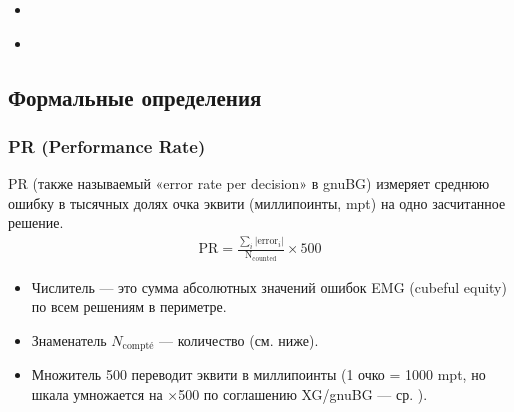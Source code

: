 \documentclass[letterpaper,10pt,russian]{sphinxmanual}
\begin{document}
\begin{sphinxcontents}
\begin{itemize}
\begin{itemize}
\item {} 
\sphinxAtStartPar
{}\label{\detokenize{stats_parity:id12}}{\hyperref[\detokenize{stats_parity:comparaison-gnubg-blunderdb-import-sgf-moteurs-differents}]{}}

\end{itemize}

\item {} 
\sphinxAtStartPar
{}\label{\detokenize{stats_parity:id13}}{\hyperref[\detokenize{stats_parity:valider-vos-propres-chiffres}]{}}

\item {} 
\sphinxAtStartPar
{}\label{\detokenize{stats_parity:id14}}{\hyperref[\detokenize{stats_parity:reference-gnubg}]{}}

\end{itemize}
\end{sphinxcontents}


\subsection{Формальные определения}
\label{\detokenize{stats_parity:definitions-formelles}}

\subsubsection{PR (Performance Rate)}
\label{\detokenize{stats_parity:pr-performance-rate}}
\sphinxAtStartPar
PR (также называемый «error rate per decision» в gnuBG) измеряет среднюю ошибку в тысячных долях очка эквити (миллипоинты, mpt) на одно засчитанное решение.
\begin{equation*}
\begin{split}\mathrm{PR} = \frac{\sum_i |\mathrm{error}_i|}{\mathrm{N_{counted}}} \times 500\end{split}
\end{equation*}\begin{itemize}
\item {} 
\sphinxAtStartPar
Числитель — это сумма абсолютных значений ошибок EMG (cubeful equity) по всем решениям в периметре.

\item {} 
\sphinxAtStartPar
Знаменатель \(N_\text{compté}\) — количество  (см. ниже).

\item {} 
\sphinxAtStartPar
Множитель 500 переводит эквити в миллипоинты (1 очко = 1000 mpt, но шкала умножается на ×500 по соглашению XG/gnuBG — ср. ).

\end{itemize}
\end{document}
